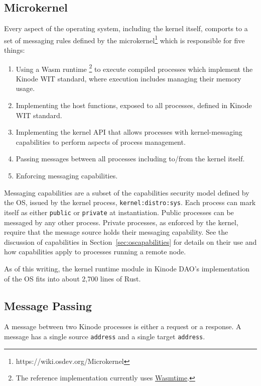 \documentclass[runningheads]{llncs}
\begin{document}
\subsection{Microkernel}
\label{sec:osmicrokernel}

Every aspect of the operating system, including the kernel itself, comports to a set of messaging rules defined by the microkernel\footnote{https://wiki.osdev.org/Microkernel} which is responsible for five things:
\begin{enumerate}
    \item Using a Wasm runtime
    \footnote{The reference implementation currently uses \href{https://wasmtime.dev}{Wasmtime}.}
    to execute compiled processes which implement the Kinode WIT standard, where execution includes managing their memory usage.
    \item Implementing the host functions, exposed to all processes, defined in Kinode WIT standard.
    \item Implementing the kernel API that allows processes with kernel-messaging capabilities to perform aspects of process management.
    \item Passing messages between all processes including to/from the kernel itself.
    \item Enforcing messaging capabilities.
\end{enumerate}

Messaging capabilities are a subset of the capabilities security model defined by the OS, issued by the kernel process, \verb|kernel:distro:sys|.
Each process can mark itself as either \verb|public| or \verb|private| at instantiation.
Public processes can be messaged by any other process.
Private processes, as enforced by the kernel, require that the message source holds their messaging capability.
See the discussion of capabilities in Section~\ref{sec:oscapabilities} for details on their use and how capabilities apply to processes running a remote node.

As of this writing, the kernel runtime module in Kinode DAO's implementation of the OS fits into about 2,700 lines of Rust.

\subsection{Message Passing}
\label{sec:osmessagepassing}

A message between two Kinode processes is either a request or a response.
A message has a single source \verb|address| and a single target \verb|address|.
\end{document}
